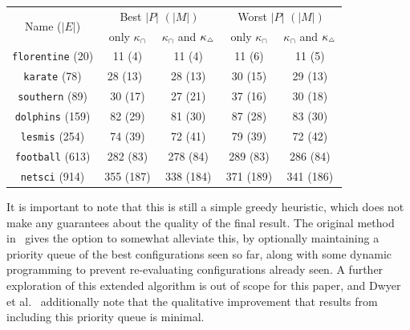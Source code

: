 \begin{table}
    \begin{tabular}{ |c|c|c|c|c| } 
        \hline
        \multirow{2}{*}{Name ($|E|$)} &
        \multicolumn{2}{c|}{Best $|P|$ $(|M|)$} & \multicolumn{2}{c|}{Worst $|P|$ $(|M|)$} \\ 
        \cline{2-5}
        & only $\kappa_\cap$ & $\kappa_\cap$ and $\kappa_{\Triangle}$ & only $\kappa_\cap$ & $\kappa_\cap$ and $\kappa_{\Triangle}$ \\ 
        \hline\hline
        \texttt{florentine} (20)
           & 11 (4)
           & 11 (4)
           & 11 (6)
           &\cellcolor{grey} 11 (5) \\
        \texttt{karate} (78)
           & 28 (13)\
           & 28 (13)
           & 30 (15)
           &\cellcolor{grey} 29 (13)\\ 
        \texttt{southern} (89)
           & 30 (17)
           &\cellcolor{grey} 27 (21)
           & 37 (16)
           &\cellcolor{grey} 30 (18)\\ 
        \texttt{dolphins} (159)
           & 82 (29)
           &\cellcolor{grey} 81 (30)
           & 87 (28)
           &\cellcolor{grey} 83 (30)\\ 
        \texttt{lesmis} (254)
           & 74 (39)
           &\cellcolor{grey} 72 (41)
           & 79 (39)
           &\cellcolor{grey} 72 (42)\\
        \texttt{football} (613)
           & 282 (83)
           &\cellcolor{grey} 278 (84)
           & 289 (83)
           &\cellcolor{grey} 286 (84)\\
        \texttt{netsci} (914)
           & 355 (187)
           &\cellcolor{grey} 338 (184)
           & 371 (189)
           &\cellcolor{grey} 341 (186)\\
           
        \hline
    \end{tabular}
    \label{tab:pgd_results}
\end{table}

It is important to note that this is still a simple greedy heuristic, which does not make any guarantees about the quality of the final result.
The original method in~\cite{Dwyer2014} gives the option to somewhat alleviate this, by optionally maintaining a priority queue of the best configurations seen so far, along with some dynamic programming to prevent re-evaluating configurations already seen.
A further exploration of this extended algorithm is out of scope for this paper, and Dwyer et al.~\cite{Dwyer2014} additionally note that the qualitative improvement that results from including this priority queue is minimal.

